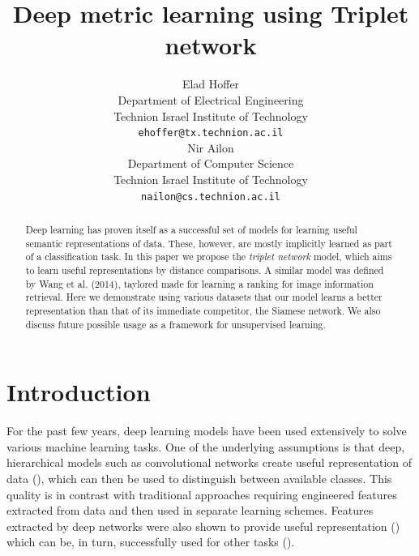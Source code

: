 \documentclass{article} %
\title{Deep metric learning using Triplet network}
\author{
Elad Hoffer \\
Department of Electrical Engineering\\
Technion Israel Institute of Technology\\
\texttt{ehoffer@tx.technion.ac.il} \\
\And
Nir Ailon \\
Department of Computer Science\\
Technion Israel Institute of Technology\\
\texttt{nailon@cs.technion.ac.il}
}
\begin{document}
\maketitle

\begin{abstract}
Deep learning has proven itself as a successful set of models for learning useful semantic representations of data. These, however, are mostly implicitly learned as part of a classification task.
In this paper we propose the \emph{triplet network} model, which aims to learn useful representations by distance comparisons.
A similar model was defined by Wang et al. (2014), taylored made for learning a ranking for image information retrieval.  Here
we demonstrate using various datasets that our model learns a better representation than that of its immediate competitor, the Siamese network.
We also discuss future possible usage as a framework for unsupervised learning.
\end{abstract}


\section{Introduction}
For the past few years, deep learning models have been used extensively to solve various machine learning tasks. One of the underlying assumptions is that deep, hierarchical models such as convolutional networks
create useful representation of data (\citet{Bengio2009,Hinton2007}), which can then be used to distinguish between available classes.
This quality is in contrast with traditional approaches  requiring engineered features extracted from data and then used in separate learning schemes.
Features extracted by deep networks were also shown to provide useful representation (\citet{Zeiler2013,Sermanet}) which can be, in turn, successfully used for other tasks (\citet{Razavian2014}).  %
\end{document}
